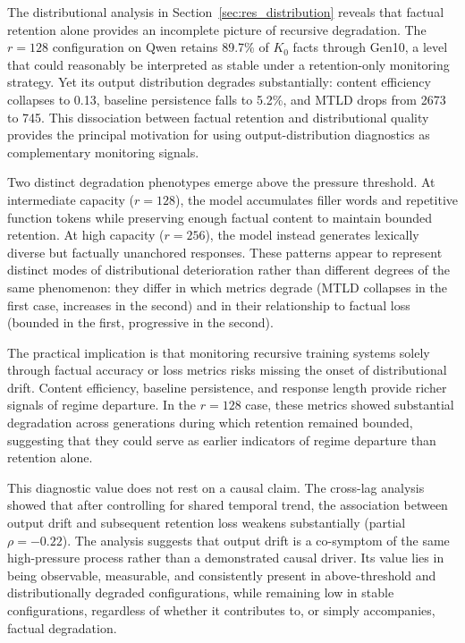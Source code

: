 \documentclass[a4paper,fleqn]{cas-dc}
\begin{document}
The distributional analysis in Section~\ref{sec:res_distribution} reveals that
factual retention alone provides an incomplete picture of recursive degradation.
The $r=128$ configuration on Qwen retains 89.7\% of $K_0$ facts through Gen10,
a level that could reasonably be interpreted as stable under a retention-only
monitoring strategy. Yet its output distribution degrades substantially: content
efficiency collapses to 0.13, baseline persistence falls to 5.2\%, and MTLD
drops from 2673 to 745. This dissociation between factual retention and
distributional quality provides the principal motivation for using
output-distribution diagnostics as complementary monitoring signals.

Two distinct degradation phenotypes emerge above the pressure threshold. At
intermediate capacity ($r=128$), the model accumulates filler words and
repetitive function tokens while preserving enough factual content to maintain
bounded retention. At high capacity ($r=256$), the model instead generates
lexically diverse but factually unanchored responses. These patterns appear to
represent distinct modes of distributional deterioration rather than different
degrees of the same phenomenon: they differ in which metrics degrade (MTLD
collapses in the first case, increases in the second) and in their relationship
to factual loss (bounded in the first, progressive in the second).

The practical implication is that monitoring recursive training systems solely
through factual accuracy or loss metrics risks missing the onset of
distributional drift. Content efficiency, baseline persistence, and response
length provide richer signals of regime departure. In the $r=128$ case, these
metrics showed substantial degradation across generations during which retention
remained bounded, suggesting that they could serve as earlier indicators of
regime departure than retention alone.

This diagnostic value does not rest on a causal claim. The
cross-lag analysis showed that after controlling for shared temporal trend, the
association between output drift and subsequent retention loss weakens
substantially (partial $\rho = -0.22$). The analysis suggests that output drift is a
co-symptom of the same high-pressure process rather than a demonstrated causal
driver. Its value lies in being observable, measurable, and consistently present
in above-threshold and distributionally degraded configurations, while remaining
low in stable configurations, regardless of whether it contributes to, or simply
accompanies, factual degradation.
\end{document}
